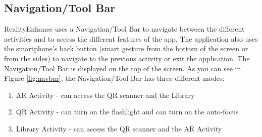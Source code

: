 \subsection{Navigation/Tool Bar}
RealityEnhance uses a Navigation/Tool Bar to navigate between the different activities and to access the different features of the app. The application also uses the smartphone's back button (smart gesture from the bottom of the screen or from the sides) to navigate to the previous activity or exit the application. The Navigation/Tool Bar is displayed on the top of the screen. As you can see in Figure \ref{fig:navbar}, the Navigation/Tool Bar has three different modes:

\renewcommand{\labelenumi}{(\alph{enumi})}
\begin{enumerate}
    \item \ac{AR} Activity  - can access the QR scanner and the Library
    \item \ac{QR} Activity - can turn on the flashlight and can turn on the auto-focus
    \item Library Activity - can access the QR scanner and the \ac{AR} Activity
\end{enumerate}

